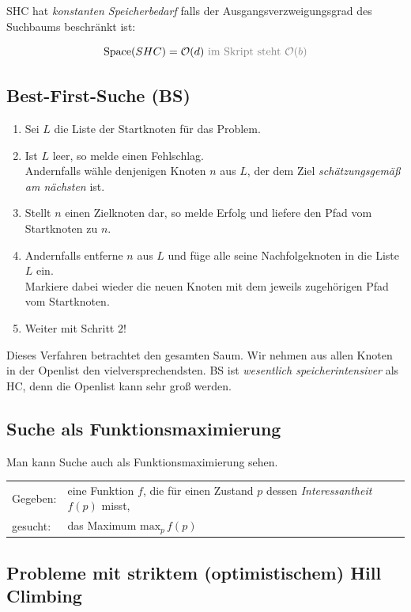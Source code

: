 \documentclass[runningheads,deutsch]{llncs}
\begin{document}
SHC hat \textit{konstanten Speicherbedarf} falls der Ausgangsverzweigungsgrad des Suchbaums beschränkt ist:

\[ \text{Space}(SHC) = \mathcal O(d) \textcolor{gray}{\text{ im Skript steht } \mathcal O(b)} \]

\subsection{Best-First-Suche (BS)}
\begin{enumerate}
    \item Sei $L$ die Liste der Startknoten für das Problem.
    \item Ist $L$ leer, so melde einen Fehlschlag. \\ Andernfalls wähle denjenigen Knoten $n$ aus $L$, der dem Ziel \textit{schätzungsgemäß am nächsten} ist.
    \item Stellt $n$ einen Zielknoten dar, so melde Erfolg und liefere den Pfad vom Startknoten zu $n$.
    \item Andernfalls entferne $n$ aus $L$ und füge alle seine Nachfolgeknoten in die Liste $L$ ein. \\ Markiere dabei wieder die neuen Knoten mit dem jeweils zugehörigen Pfad vom Startknoten.
    \item Weiter mit Schritt $2$!
\end{enumerate}

Dieses Verfahren betrachtet den gesamten Saum. Wir nehmen aus allen Knoten in der Openlist den vielversprechendsten. BS ist \textit{wesentlich speicherintensiver} als HC, denn die Openlist kann sehr groß werden.

\subsection{Suche als Funktionsmaximierung}

Man kann Suche auch als Funktionsmaximierung sehen.

\begin{center}
    \begin{tabular}{l l}
        Gegeben: & eine Funktion $f$, die für einen Zustand $p$ dessen \textit{Interessantheit} $f(p)$ misst, \\
        gesucht: & das Maximum $\text{max}_p\, f(p)$
    \end{tabular}
\end{center}

\subsection{Probleme mit striktem (optimistischem) Hill Climbing}
\end{document}
